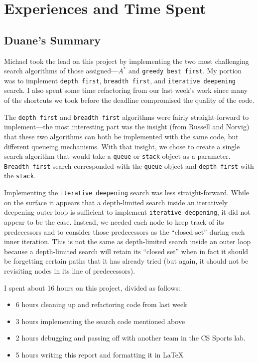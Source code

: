 \chapter{Experiences and Time Spent}\label{chap:exp}
\section{Duane's Summary}
Michael took the lead on this project by implementing the two most challenging search algorithms of those assigned---$A^*$ and \texttt{greedy best first}.  My portion was to implement \texttt{depth first}, \texttt{breadth first}, and \texttt{iterative deepening} search.  I also spent some time refactoring from our last week's work since many of the shortcuts we took before the deadline compromised the quality of the code.
\par
The \texttt{depth first} and \texttt{breadth first} algorithms were fairly straight-forward to implement---the most interesting part was the insight (from Russell and Norvig) that these two algorithms can both be implemented with the same code, but different queueing mechanisms.  With that insight, we chose to create a single search algorithm that would take a \texttt{queue} or \texttt{stack} object as a parameter.  \texttt{Breadth first} search corresponded with the \texttt{queue} object and \texttt{depth first} with the \texttt{stack}.
\par
Implementing the \texttt{iterative deepening} search was less straight-forward.  While on the surface it appears that a depth-limited search inside an iteratively deepening outer loop is sufficient to implement \texttt{iterative deepening}, it did not appear to be the case.  Instead, we needed each node to keep track of its predecessors and to consider those predecessors as the ``closed set'' during each inner iteration.  This is not the same as depth-limited search inside an outer loop because a depth-limited search will retain its ``closed set'' when in fact it should be forgetting certain paths that it has already tried (but again, it should not be revisiting nodes in its line of predecessors).
\par
I spent about 16 hours on this project, divided as follows:
\begin{itemize}
    \item 6 hours cleaning up and refactoring code from last week
    \item 3 hours implementing the search code mentioned above
    \item 2 hours debugging and passing off with another team in the CS Sports lab.
    \item 5 hours writing this report and formatting it in \LaTeX
\end{itemize}


